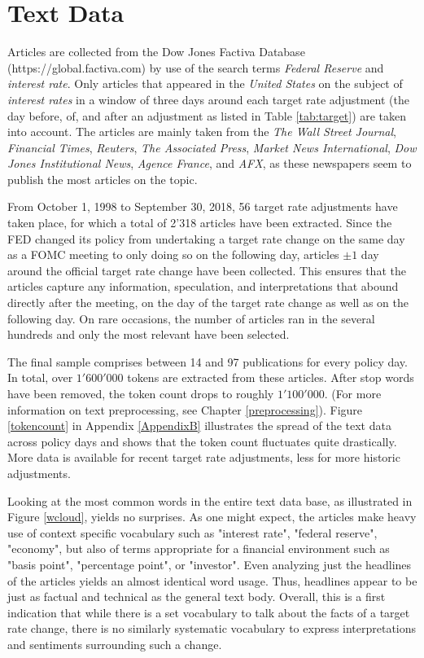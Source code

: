 \documentclass[11pt,a4paper,english,oneside]{book}
\numberwithin{equation}{chapter}
\begin{document}
\section{Text Data}

Articles are collected from the Dow Jones Factiva Database (https://global.factiva.com) by use of the search terms \textit{Federal Reserve} and \textit{interest rate}. Only articles that appeared in the \textit{United States} on the subject of \textit{interest rates} in a window of three days around each target rate adjustment (the day before, of, and after an adjustment as listed in Table \ref{tab:target}) are taken into account. The articles are mainly taken from the \textit{The Wall Street Journal}, \textit{Financial Times}, \textit{Reuters}, \textit{The Associated Press}, \textit{Market News International}, \textit{Dow Jones Institutional News}, \textit{Agence France}, and \textit{AFX}, as these newspapers seem to publish the most articles on the topic. 

From October 1, 1998 to September 30, 2018, 56 target rate adjustments have taken place, for which a total of 2'318 articles have been extracted. Since the FED changed its policy from undertaking a target rate change on the same day as a FOMC meeting to only doing so on the following day, articles $\pm1$ day around the official target rate change have been collected. This ensures that the articles capture any information, speculation, and interpretations that abound directly after the meeting, on the day of the target rate change as well as on the following day. On rare occasions, the number of articles ran in the several hundreds and only the most relevant have been selected. 

The final sample comprises between 14 and 97 publications for every policy day. In total, over $1'600'000$ tokens are extracted from these articles. After stop words have been removed, the token count drops to roughly $1'100'000$. (For more information on text preprocessing, see Chapter \ref{preprocessing}). Figure \ref{tokencount} in Appendix \ref{AppendixB} illustrates the spread of the text data across policy days and shows that the token count fluctuates quite drastically. More data is available for recent target rate adjustments, less for more historic adjustments.

Looking at the most common words in the entire text data base, as illustrated in Figure \ref{wcloud}, yields no surprises. As one might expect, the articles make heavy use of context specific vocabulary such as "interest rate", "federal reserve", "economy", but also of terms appropriate for a financial environment such as "basis point", "percentage point", or "investor". Even analyzing just the headlines of the articles yields an almost identical word usage. Thus, headlines appear to be just as factual and technical as the general text body. Overall, this is a first indication that while there is a set vocabulary to talk about the facts of a target rate change, there is no similarly systematic vocabulary to express interpretations and sentiments surrounding such a change. 
\end{document}

